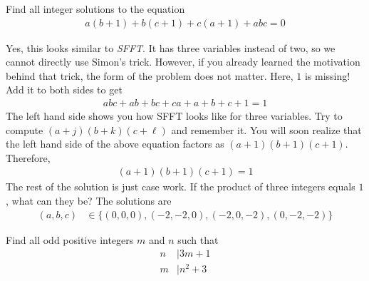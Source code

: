\documentclass{subfile}
\begin{document}
	\begin{problem}
		Find all integer solutions to the equation
			\begin{align*}
				a(b+1)+b(c+1)+c(a+1)+abc=0
			\end{align*}
	\end{problem}

	\begin{solution}
		Yes, this looks similar to \textit{SFFT}. It has three variables instead of two, so we cannot directly use Simon's trick. However, if you already learned the motivation behind that trick, the form of the problem does not matter. Here, $1$ is missing! Add it to both sides to get
			\begin{align*}
				abc+ab+bc+ca+a+b+c+1=1
			\end{align*}
		The left hand side shows you how SFFT looks like for three variables. Try to compute $(a+j)(b+k)(c+\ell)$ and remember it. You will soon realize that the left hand side of the above equation factors as $(a+1)(b+1)(c+1)$. Therefore,
			\begin{align*}
				(a+1)(b+1)(c+1)=1
			\end{align*}
		The rest of the solution is just case work. If the product of three integers equals $1$, what can they be? The solutions are
			\begin{align*}
				(a,b,c)
					& \in\{(0,0,0), (-2,-2,0), (-2,0,-2), (0,-2,-2)\}
			\end{align*}
	\end{solution}

	\begin{problem}
		Find all odd positive integers $m$ and $n$ such that
			\begin{align*}
				n
					& \mid 3m+1\\
				m
					& \mid n^2+3
			\end{align*}
	\end{problem}
\end{document}
